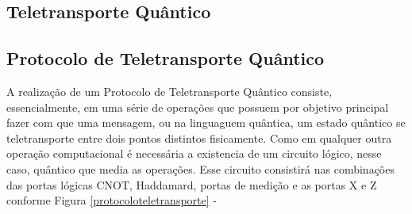 \documentclass[11pt,oneside,brazil,hidelinks,article,sumario=tradicional,a4paper]{abntex2}
\begin{document}
\subsection{Teletransporte Quântico}
%
%
%


\subsection{Protocolo de Teletransporte Quântico}

A realização de um Protocolo de Teletransporte Quântico consiste, essencialmente, em uma série de operações que possuem por objetivo principal fazer com que uma mensagem, ou na linguaguem quântica, um estado quântico se teletransporte entre dois pontos distintos fisicamente. 
Como em qualquer outra operação computacional é necessária a existencia de um circuito lógico, nesse caso, quântico que media as operações. Esse circuito consistirá nas combinações das portas lógicas CNOT, Haddamard, portas de medição e as portas X e Z conforme Figura \ref{protocoloteletransporte}
-
\end{document}

